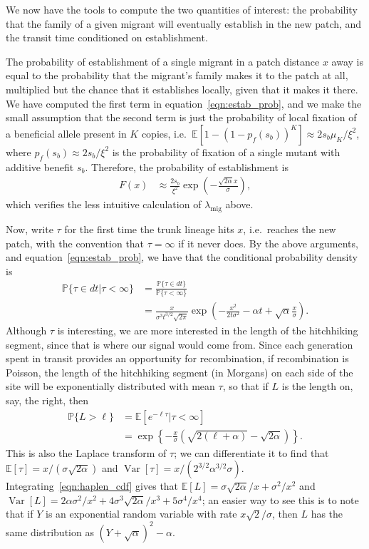 \documentclass{article}
\DeclareMathOperator{\var}{Var}
\renewcommand{\P}{\mathbb{P}}
\newcommand{\E}{\mathbb{E}}
\newcommand{\migrate}{\lambda_\text{mig}}
\begin{document}
We now have the tools to compute the two quantities of interest:
the probability that the family of a given migrant will eventually establish in the new patch,
and the transit time conditioned on establishment.

The probability of establishment of a single migrant in a patch distance $x$ away
is equal to the probability that the migrant's family makes it to the patch at all,
multiplied but the chance that it establishes locally, given that it makes it there.
We have computed the first term in equation~\eqref{eqn:estab_prob},
and we make the small assumption that the second term is just the probability of local fixation
of a beneficial allele present in $K$ copies,
i.e.~$\E[1-(1-p_f(s_b))^K] \approx 2 s_b \mu_K/\xi^2$,
where $p_f(s_b) \approx 2s_b/\xi^2$ is the probability of fixation of a single mutant with additive benefit $s_b$.
Therefore, the probability of establishment is
\begin{align} \label{eqn:bp_prob_estab}
  F(x) &\approx \frac{2s_b}{\xi^2} \exp\left( - \frac{\sqrt{2 \alpha} x}{\sigma} \right) ,
\end{align}
which verifies the less intuitive calculation of $\migrate$ above.

Now, write $\tau$ for the first time the trunk lineage hits $x$, i.e.\ reaches the new patch,
with the convention that $\tau=\infty$ if it never does.
By the above arguments, and equation~\eqref{eqn:estab_prob}, we have that the conditional probability density is
\begin{align}
  \P\{\tau\in dt | \tau<\infty \} &= \frac{\P\{\tau \in dt\}}{\P\{\tau<\infty\}} \\
  &= \frac{x}{\sigma^3 t^{3/2}\sqrt{2\pi}} \exp\left(-\frac{x^2}{2t\sigma^2} -\alpha t + \sqrt{\alpha} \frac{x}{\sigma} \right) .
\end{align}
Although $\tau$ is interesting, we are more interested in the length of the hitchhiking segment,
since that is where our signal would come from.
Since each generation spent in transit provides an opportunity for recombination,
if recombination is Poisson, the length of the hitchhiking segment (in Morgans) on each side of the site will be exponentially distributed
with mean $\tau$, so that if $L$ is the length on, say, the right, then
\begin{align} \label{eqn:haplen_cdf}
\P\{L>\ell\} &= \E[e^{-\ell \tau}|\tau<\infty] \\
  &= \exp\left\{{-\frac{x}{\sigma}\left(\sqrt{2(\ell+\alpha)} - \sqrt{2\alpha}\right)}\right\} .
\end{align}
This is also the Laplace transform of $\tau$;
we can differentiate it to find that $\E[\tau] = x/(\sigma\sqrt{2\alpha})$
and $\var[\tau] = x/( 2^{3/2}\alpha^{3/2}\sigma)$.
Integrating~\eqref{eqn:haplen_cdf} gives that 
$\E[L] = \sigma \sqrt{2\alpha}/x + \sigma^2/x^2$ and $\var[L] = 2\alpha\sigma^2/x^2 + 4 \sigma^3 \sqrt{2\alpha}/x^3 + 5 \sigma^4 / x^4$;
an easier way to see this is to note that if $Y$ is an exponential random variable with rate $x\sqrt{2}/\sigma$,
then $L$ has the same distribution as $(Y + \sqrt{\alpha})^2 - \alpha$.
\end{document}
